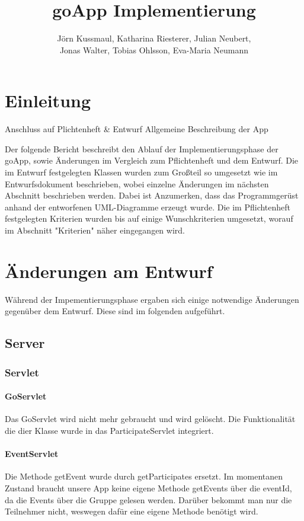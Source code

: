 \documentclass{scrartcl}
\title{goApp Implementierung}
\author{Jörn Kussmaul, Katharina Riesterer, Julian Neubert,\\ Jonas Walter, Tobias Ohlsson, Eva-Maria Neumann}
\begin{document}
	\maketitle
	\newpage
	\tableofcontents
	\newpage

	\section{Einleitung}%
	Anschluss auf Plichtenheft \& Entwurf
	Allgemeine Beschreibung der App
	
	Der folgende Bericht beschreibt den Ablauf der Implementierungsphase der goApp, sowie Änderungen im Vergleich zum Pflichtenheft und dem Entwurf. Die im Entwurf festgelegten Klassen wurden zum Großteil so umgesetzt wie im Entwurfsdokument beschrieben, wobei einzelne Änderungen im nächsten Abschnitt beschrieben werden. Dabei ist Anzumerken, dass das Programmgerüst anhand der entworfenen UML-Diagramme erzeugt wurde. Die im Pflichtenheft festgelegten Kriterien wurden bis auf einige Wunschkriterien umgesetzt, worauf im Abschnitt "Kriterien" näher eingegangen wird.
	\newpage
	\section{Änderungen am Entwurf}
	Während der Impementierungsphase ergaben sich einige notwendige Änderungen gegenüber dem Entwurf. Diese sind im folgenden aufgeführt.
	
	\subsection{Server}
	\subsubsection{Servlet}
	\paragraph{GoServlet}
	Das GoServlet wird nicht mehr gebraucht und wird gelöscht. Die Funktionalität die dier Klasse wurde in das ParticipateServlet integriert.
	
	\paragraph{EventServlet}
	Die Methode getEvent wurde durch getParticipates ersetzt. Im momentanen Zustand braucht unsere App keine eigene Methode getEvents über die eventId, da die Events über die Gruppe gelesen werden. 
	Darüber bekommt man nur die Teilnehmer nicht, weswegen dafür eine eigene Methode benötigt wird.
	
\end{document}
